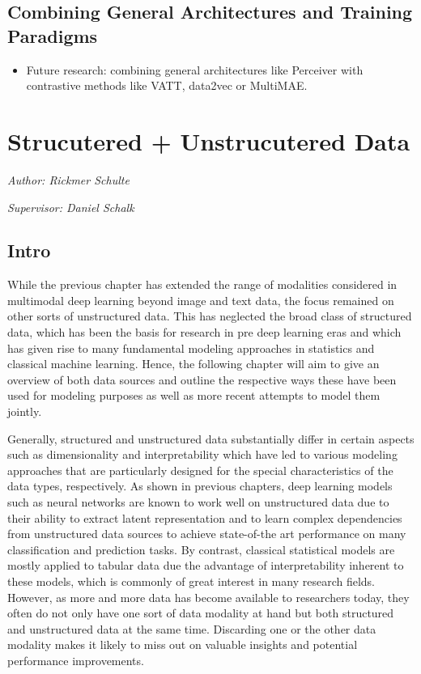 \documentclass[
]{krantz}
\providecommand{\tightlist}{%
  \setlength{\itemsep}{0pt}\setlength{\parskip}{0pt}}
\begin{document}
\hypertarget{combining-general-architectures-and-training-paradigms}{%
\subsection{Combining General Architectures and Training Paradigms}\label{combining-general-architectures-and-training-paradigms}}

\begin{itemize}
\tightlist
\item
  Future research: combining general architectures like Perceiver with contrastive methods like VATT, data2vec or MultiMAE.
\end{itemize}

\hypertarget{strucutered-unstrucutered-data}{%
\section{Strucutered + Unstrucutered Data}\label{strucutered-unstrucutered-data}}

\emph{Author: Rickmer Schulte}

\emph{Supervisor: Daniel Schalk}

\hypertarget{intro-2}{%
\subsection{Intro}\label{intro-2}}

While the previous chapter has extended the range of modalities considered in multimodal deep learning beyond image and text data, the focus remained on other sorts of unstructured data. This has neglected the broad class of structured data, which has been the basis for research in pre deep learning eras and which has given rise to many fundamental modeling approaches in statistics and classical machine learning. Hence, the following chapter will aim to give an overview of both data sources and outline the respective ways these have been used for modeling purposes as well as more recent attempts to model them jointly.

Generally, structured and unstructured data substantially differ in certain aspects such as dimensionality and interpretability which have led to various modeling approaches that are particularly designed for the special characteristics of the data types, respectively. As shown in previous chapters, deep learning models such as neural networks are known to work well on unstructured data due to their ability to extract latent representation and to learn complex dependencies from unstructured data sources to achieve state-of-the art performance on many classification and prediction tasks. By contrast, classical statistical models are mostly applied to tabular data due the advantage of interpretability inherent to these models, which is commonly of great interest in many research fields. However, as more and more data has become available to researchers today, they often do not only have one sort of data modality at hand but both structured and unstructured data at the same time. Discarding one or the other data modality makes it likely to miss out on valuable insights and potential performance improvements.
\end{document}

